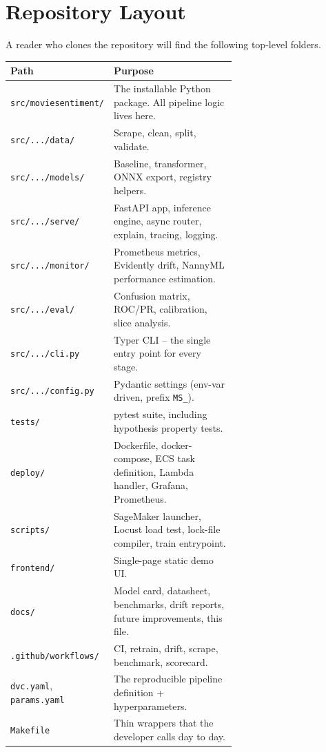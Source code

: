 \documentclass[11pt,a4paper]{article}
\begin{document}
\section{Repository Layout}

A reader who clones the repository will find the following top-level folders.

\begin{longtable}{@{}lp{0.65\linewidth}@{}}
\toprule
\textbf{Path} & \textbf{Purpose} \\
\midrule \endhead
\texttt{src/moviesentiment/}    & The installable Python package. All pipeline logic lives here. \\
\texttt{src/.../data/}          & Scrape, clean, split, validate. \\
\texttt{src/.../models/}        & Baseline, transformer, ONNX export, registry helpers. \\
\texttt{src/.../serve/}         & FastAPI app, inference engine, async router, explain, tracing, logging. \\
\texttt{src/.../monitor/}       & Prometheus metrics, Evidently drift, NannyML performance estimation. \\
\texttt{src/.../eval/}          & Confusion matrix, ROC/PR, calibration, slice analysis. \\
\texttt{src/.../cli.py}         & Typer CLI -- the single entry point for every stage. \\
\texttt{src/.../config.py}      & Pydantic settings (env-var driven, prefix \texttt{MS\_}). \\
\texttt{tests/}                 & pytest suite, including hypothesis property tests. \\
\texttt{deploy/}                & Dockerfile, docker-compose, ECS task definition, Lambda handler, Grafana, Prometheus. \\
\texttt{scripts/}               & SageMaker launcher, Locust load test, lock-file compiler, train entrypoint. \\
\texttt{frontend/}              & Single-page static demo UI. \\
\texttt{docs/}                  & Model card, datasheet, benchmarks, drift reports, future improvements, this file. \\
\texttt{.github/workflows/}     & CI, retrain, drift, scrape, benchmark, scorecard. \\
\texttt{dvc.yaml}, \texttt{params.yaml} & The reproducible pipeline definition + hyperparameters. \\
\texttt{Makefile}               & Thin wrappers that the developer calls day to day. \\
\bottomrule
\end{longtable}
\end{document}
